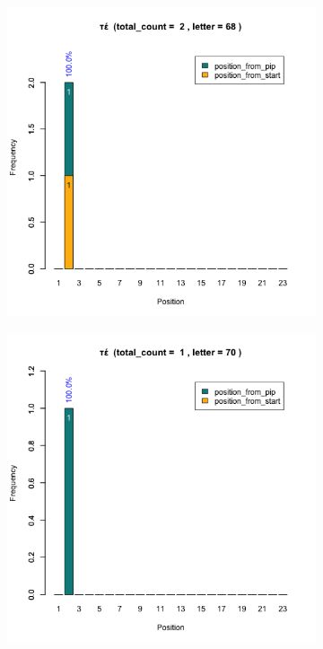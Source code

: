 \documentclass[a4paper]{article}
\begin{document}
\begin{figure}
\begin{subfigure}{0.45\textwidth}
\end{subfigure}
\begin{subfigure}{0.45\textwidth}
\centering
\includegraphics[width=1\linewidth]{../../data/output/paul_R_par/plots/par9_lt68.png}
\end{subfigure}
\begin{subfigure}{0.45\textwidth}
\centering
\includegraphics[width=1\linewidth]{../../data/output/paul_R_par/plots/par9_lt70.png}

\end{subfigure}
\end{figure}
\end{document}
